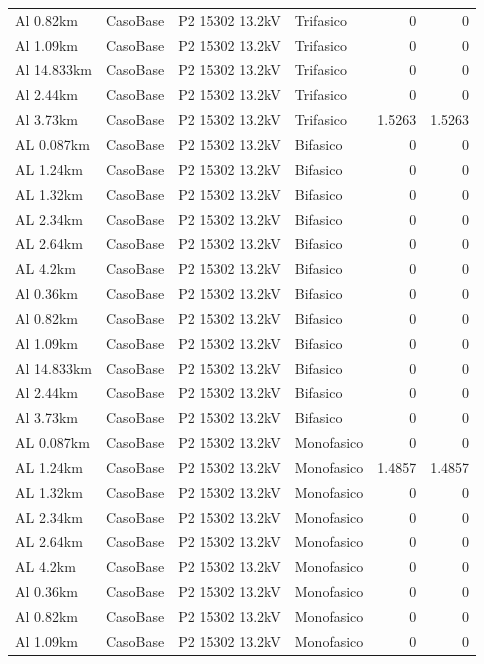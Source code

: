 \documentclass[11pt,a4paper]{article}
\begin{document}
\begin{longtable}{llllrr}
Al 0.82km & CasoBase & P2 15302 13.2kV & Trifasico & 0 & 0 \\
Al 1.09km & CasoBase & P2 15302 13.2kV & Trifasico & 0 & 0 \\
Al 14.833km & CasoBase & P2 15302 13.2kV & Trifasico & 0 & 0 \\
Al 2.44km & CasoBase & P2 15302 13.2kV & Trifasico & 0 & 0 \\
Al 3.73km & CasoBase & P2 15302 13.2kV & Trifasico & 1.5263 & 1.5263 \\
AL 0.087km & CasoBase & P2 15302 13.2kV & Bifasico & 0 & 0 \\
AL 1.24km & CasoBase & P2 15302 13.2kV & Bifasico & 0 & 0 \\
AL 1.32km & CasoBase & P2 15302 13.2kV & Bifasico & 0 & 0 \\
AL 2.34km & CasoBase & P2 15302 13.2kV & Bifasico & 0 & 0 \\
AL 2.64km & CasoBase & P2 15302 13.2kV & Bifasico & 0 & 0 \\
AL 4.2km & CasoBase & P2 15302 13.2kV & Bifasico & 0 & 0 \\
Al 0.36km & CasoBase & P2 15302 13.2kV & Bifasico & 0 & 0 \\
Al 0.82km & CasoBase & P2 15302 13.2kV & Bifasico & 0 & 0 \\
Al 1.09km & CasoBase & P2 15302 13.2kV & Bifasico & 0 & 0 \\
Al 14.833km & CasoBase & P2 15302 13.2kV & Bifasico & 0 & 0 \\
Al 2.44km & CasoBase & P2 15302 13.2kV & Bifasico & 0 & 0 \\
Al 3.73km & CasoBase & P2 15302 13.2kV & Bifasico & 0 & 0 \\
AL 0.087km & CasoBase & P2 15302 13.2kV & Monofasico & 0 & 0 \\
AL 1.24km & CasoBase & P2 15302 13.2kV & Monofasico & 1.4857 & 1.4857 \\
AL 1.32km & CasoBase & P2 15302 13.2kV & Monofasico & 0 & 0 \\
AL 2.34km & CasoBase & P2 15302 13.2kV & Monofasico & 0 & 0 \\
AL 2.64km & CasoBase & P2 15302 13.2kV & Monofasico & 0 & 0 \\
AL 4.2km & CasoBase & P2 15302 13.2kV & Monofasico & 0 & 0 \\
Al 0.36km & CasoBase & P2 15302 13.2kV & Monofasico & 0 & 0 \\
Al 0.82km & CasoBase & P2 15302 13.2kV & Monofasico & 0 & 0 \\
Al 1.09km & CasoBase & P2 15302 13.2kV & Monofasico & 0 & 0 \\

\end{longtable}
\end{document}
